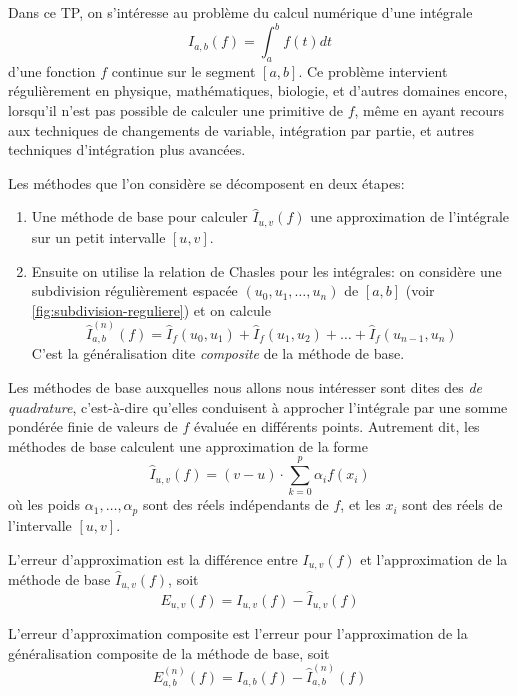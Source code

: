 

Dans ce TP, on s'intéresse au problème du calcul numérique d'une intégrale \[
    I_{a, b}(f) = \int_{a}^{b} f(t)dt
\]
d'une fonction $ f $ continue sur le segment $ [a, b] $. Ce problème intervient régulièrement en physique, mathématiques, biologie, et d'autres domaines encore, lorsqu'il n'est pas possible de calculer une primitive de $ f $, même en ayant recours aux techniques de changements de variable, intégration par partie, et autres techniques d'intégration plus avancées.

Les méthodes que l'on considère se décomposent en deux étapes:
\begin{enumerate}
    \item Une méthode de base pour calculer $ \hat{I}_{u, v}(f) $ une approximation de l'intégrale sur un petit intervalle $ [u, v] $.
    \item Ensuite on utilise la relation de Chasles pour les intégrales: on considère une subdivision régulièrement espacée $ (u_0, u_1, \ldots, u_n) $ de $ [a, b] $ (voir \autoref{fig:subdivision-reguliere}) et on calcule \[
        \hat{I}^{(n)}_{a, b}(f) = \hat{I}_f(u_0, u_1) + \hat{I}_f(u_1, u_2) + \ldots + \hat{I}_f(u_{n-1}, u_n)
    \]
    C'est la généralisation dite \textit{composite} de la méthode de base.
\end{enumerate}

Les méthodes de base auxquelles nous allons nous intéresser sont dites des \textit{de quadrature}, c'est-à-dire qu'elles conduisent à approcher l'intégrale par une somme pondérée finie de valeurs de $ f $ évaluée en différents points. Autrement dit, les méthodes de base calculent une approximation de la forme 
\begin{equation}
    \label{eq:quadrature}
    \hat{I}_{u, v}(f) = (v-u) \cdot \sum_{k=0}^{p} \alpha_i f(x_i)
\end{equation}
où les poids $ \alpha_1, \ldots, \alpha_p $ sont des réels indépendants de $ f $, et les $ x_i $ sont des réels de l'intervalle $ [u, v] $.

L'erreur d'approximation est la différence entre $ I_{u, v}(f) $ et l'approximation de la méthode de base $ \hat{I}_{u, v}(f) $, soit \[
    E_{u, v}(f) =  I_{u, v}(f) -  \hat{I}_{u, v}(f) 
\]

L'erreur d'approximation composite est l'erreur pour l'approximation de la généralisation composite de la méthode de base, soit \[
    E^{(n)}_{a, b}(f) =  I_{a, b}(f) -  \hat{I}^{(n)}_{a, b}(f) 
\]


